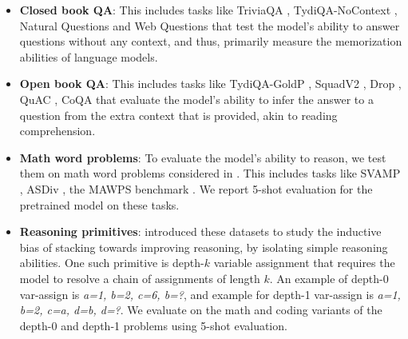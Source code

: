 \begin{itemize}[leftmargin=0.6cm]
    \item {\bf Closed book QA}: This includes tasks like TriviaQA \citep{joshi2017triviaqa}, TydiQA-NoContext \citep{clark2020tydi}, Natural Questions \citep{kwiatkowski2019natural} and Web Questions \citep{talmor2018web} that test the model's ability to answer questions without any context, and thus, primarily measure the memorization abilities of language models.
    
    \item {\bf Open book QA}: This includes tasks like TydiQA-GoldP \citep{clark2020tydi}, SquadV2 \citep{rajpurkar2018know}, Drop \citep{dua2019drop}, QuAC \citep{choi2018quac}, CoQA \citep{reddy2019coqa} that evaluate the model's ability to infer the answer to a question from the extra context that is provided, akin to reading comprehension.
    
    \item {\bf Math word problems}: To evaluate the model's ability to reason, we test them on math word problems considered in \citep{wei2022chain}. This includes tasks like SVAMP \citep{patel2021nlp}, ASDiv \citep{miao2020diverse}, the MAWPS benchmark \citep{koncel2016mawps}.
    We report 5-shot evaluation for the pretrained model on these tasks.
    
    \item {\bf Reasoning primitives}: \citet{saunshi2024inductive} introduced these datasets to study the inductive bias of stacking towards improving reasoning, by isolating simple reasoning abilities. One such primitive is depth-$k$ variable assignment that requires the model to resolve a chain of assignments of length $k$. 
    An example of depth-0 var-assign is \textit{a=1, b=2, c=6, b=?}, and example for depth-1 var-assign is \textit{a=1, b=2, c=a, d=b, d=?}. We evaluate on the math and coding variants of the depth-0 and depth-1 problems using 5-shot evaluation.
        
\end{itemize}

